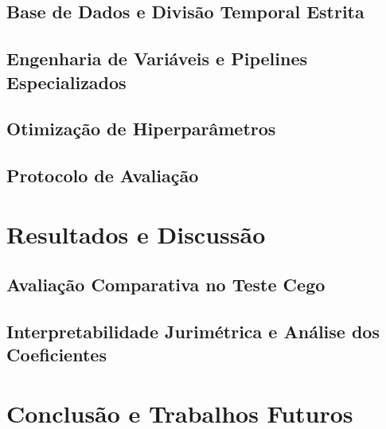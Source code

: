 \documentclass[conference]{IEEEtran}
\begin{document}
\subsection{Base de Dados e Divisão Temporal Estrita}

\subsection{Engenharia de Variáveis e Pipelines Especializados}

\subsection{Otimização de Hiperparâmetros}

\subsection{Protocolo de Avaliação}

\section{Resultados e Discussão}

\subsection{Avaliação Comparativa no Teste Cego}

\subsection{Interpretabilidade Jurimétrica e Análise dos Coeficientes}

\section{Conclusão e Trabalhos Futuros}
\end{document}
